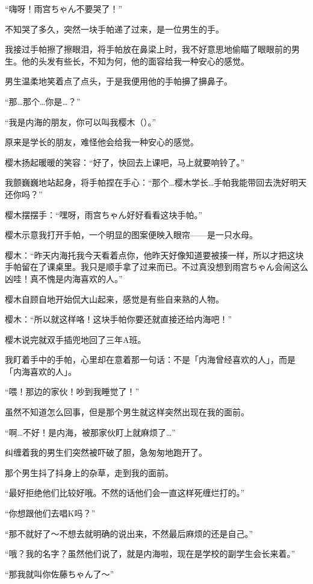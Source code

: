 “嗨呀！雨宫ちゃん不要哭了！”

不知哭了多久，突然一块手帕递了过来，是一位男生的手。

我接过手帕擦了擦眼泪，将手帕放在鼻梁上时，我不好意思地偷瞄了眼眼前的男生。他的头发有些长，不知为何，他的面容给我一种安心的感觉。

男生温柔地笑着点了点头，于是我便用他的手帕擤了擤鼻子。

“那…那个…你是…？”

“我是内海的朋友，你可以叫我樱木（）。”

原来是学长的朋友，难怪他会给我一种安心的感觉。

樱木扬起暖暖的笑容：“好了，快回去上课吧，马上就要响铃了。”

我颤巍巍地站起身，将手帕捏在手心：“那个…樱木学长…手帕我能带回去洗好明天还你吗？”

樱木摆摆手：“嘿呀，雨宫ちゃん好好看看这块手帕。”

樱木示意我打开手帕，一个明显的图案便映入眼帘——是一只水母。

樱木：“昨天内海托我今天看着点你，他昨天好像知道要被揍一样，所以才把这块手帕留在了课桌里。我只是顺手拿了过来而已。不过真没想到雨宫ちゃん会闹这么凶哇！真不愧是内海喜欢的人。”

樱木自顾自地开始侃大山起来，感觉是有些自来熟的人物。

樱木：“所以就这样咯！这块手帕你要还就直接还给内海吧！”

樱木说完就双手插兜地回了三年A班。

我盯着手中的手帕，心里却在意着那一句话：不是「内海曾经喜欢的人」，而是「内海喜欢的人」。

\cutlineb

“喂！那边的家伙！吵到我睡觉了！”

虽然不知道怎么回事，但是那个男生就这样突然出现在我的面前。

“啊…不好！是内海，被那家伙盯上就麻烦了…”

纠缠着我的男生们突然被吓破了胆，急匆匆地跑开了。

那个男生抖了抖身上的杂草，走到我的面前。

“最好拒绝他们比较好哦。不然的话他们会一直这样死缠烂打的。”

“你想跟他们去唱K吗？”

“那不就好了～不想去就明确的说出来，不然最后麻烦的还是自己。”

“哦？我的名字？虽然他们说了，就是内海啦，现在是学校的副学生会长来着。”

“那我就叫你佐藤ちゃん了～”

